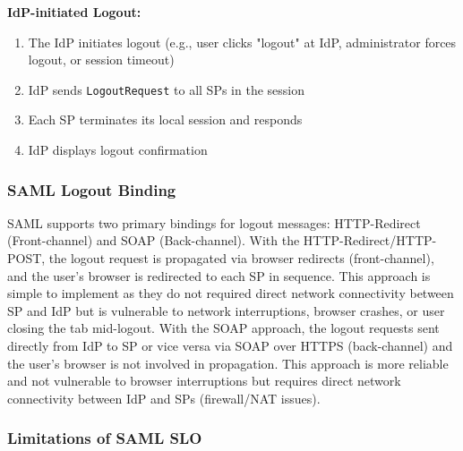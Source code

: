 \documentclass[../memoire.tex]{subfiles}
\begin{document}
\textbf{IdP-initiated Logout:}
\begin{enumerate}
  \item The IdP initiates logout (e.g., user clicks "logout" at IdP, administrator forces logout, or session timeout)
  \item IdP sends \texttt{LogoutRequest} to all SPs in the session
  \item Each SP terminates its local session and responds
  \item IdP displays logout confirmation
\end{enumerate}

\subsubsection*{SAML Logout Binding}

SAML supports two primary bindings for logout messages: HTTP-Redirect (Front-channel) and SOAP (Back-channel)\cite[section~4.1]{oasissaml}. 
With the HTTP-Redirect/HTTP-POST, the logout request is propagated via browser redirects (front-channel), and the user's browser is redirected to each SP in sequence. This approach is simple to implement as they do not required direct network connectivity between SP and IdP \cite[p.~347]{wilson2022} but is vulnerable to network interruptions, browser crashes, or user closing the tab mid-logout. 
With the SOAP approach, the logout requests sent directly from IdP to SP or vice versa via SOAP over HTTPS (back-channel) and the user's browser is not involved in propagation\cite[section~5.3]{oasissaml}. This approach is more reliable and not vulnerable to browser interruptions but requires direct network connectivity between IdP and SPs (firewall/NAT issues).

\subsubsection*{Limitations of SAML SLO}
\end{document}

